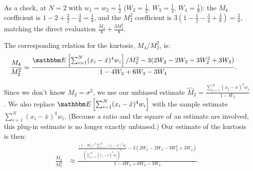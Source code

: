 \documentclass{article}
\newcommand{\E}[1]{\mathbbm E\left[#1\right]}
\begin{document}
As a check, at $N = 2$ with $w_1 = w_2 = \tfrac{1}{2}$ ($W_2 = \tfrac{1}{2}$,
$W_3 = \tfrac{1}{4}$, $W_4 = \tfrac{1}{8}$): the $M_4$ coefficient is
$1 - 2 + \tfrac{3}{2} - \tfrac{3}{8} = \tfrac{1}{8}$, and the $M_2^2$ coefficient is
$3(1 - \tfrac{1}{2} - \tfrac{3}{4} + \tfrac{3}{8}) = \tfrac{3}{8}$, matching the direct
evaluation $\tfrac{M_4}{8} + \tfrac{3 M_2^2}{8}$.

The corresponding relation for the kurtosis, $M_4 / M_2^2$, is:
\begin{align}
    \frac{M_4}{M_2^2} &= \frac{\E{\sum_{i=1}^N (x_i - {\bar x})^4 w_i} / M_2^2 - 3 (2 W_2 - 2 W_3 - 3 W_2^2 + 3 W_4)}{1 - 4 W_2 + 6 W_3 - 3 W_4}.
\end{align}

Since we don't know $M_2 = \sigma^2$, we use our unbiased estimate
${\widehat M}_2 = \frac{\sum_{j=1}^N (x_j - {\bar x})^2 w_j}{1 - W_2}$.
We also replace $\E{\sum_{i=1}^N (x_i - {\bar x})^4 w_i}$ with the sample estimate
$\sum_{i=1}^N (x_i - {\bar x})^4 w_i$. (Because a ratio and the square of an
estimate are involved, this plug-in estimate is no longer exactly unbiased.)
Our estimate of the kurtosis is then:
\begin{align}
    \frac{M_4}{M_2^2} &\approx \frac{
        \displaystyle \frac{(1 - W_2)^2 \sum_{i=1}^N (x_i - {\bar x})^4 w_i}{\left(\sum_{j=1}^N (x_j - {\bar x})^2 w_j\right)^2}
        - 3 (2 W_2 - 2 W_3 - 3 W_2^2 + 3 W_4)
    }{1 - 4 W_2 + 6 W_3 - 3 W_4}.
\end{align}
\end{document}
